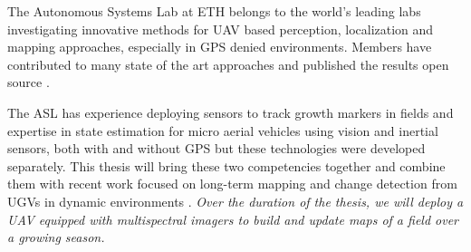 The Autonomous Systems Lab at
ETH belongs to the world's leading labs investigating innovative methods for UAV based perception, localization and mapping approaches, especially in GPS denied environments. Members have contributed to many state of the art approaches and published the results open source \cite{steder2008visual,weiss2012real,weiss2012versatile,leutenegger_rss13}. 

 

 The ASL has experience deploying sensors to track growth markers in fields \cite{mielewczik2013diel,walter2012advanced} and expertise in state estimation for micro aerial vehicles using vision and inertial sensors, both with and without GPS \cite{weiss13monocular,leutenegger_rss13} but these technologies were developed separately. This thesis will bring these two competencies together and combine them with recent work focused on long-term mapping and change detection from UGVs in dynamic environments \cite{pomerleau_icra14}. {\em Over the duration of the thesis, we will deploy a UAV equipped with multispectral imagers to build and update maps of a field over a growing season.}

 \fi

